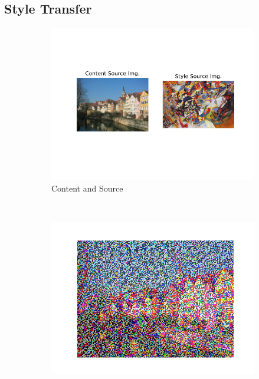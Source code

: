 \documentclass[12pt]{article}
\begin{document}
\subsection{Style Transfer}
\begin{figure}[htbp]
    \centering
    \begin{subfigure}[t]{0.48\textwidth}
        \centering
        \includegraphics[trim={3in 1in 3in 2in},scale=0.8]{./Homework2/output/hw2p2_fig01.png}
        \caption{Content and Source}
    \label{hw2p2a}
    \end{subfigure}\\
    \begin{subfigure}[t]{0.48\textwidth}
        \centering
        \includegraphics[trim={3in 0in 3in 0in},scale=0.5]{./Homework2/output/hw2p2_fig02.png}

\end{subfigure}
\end{figure}
\end{document}
